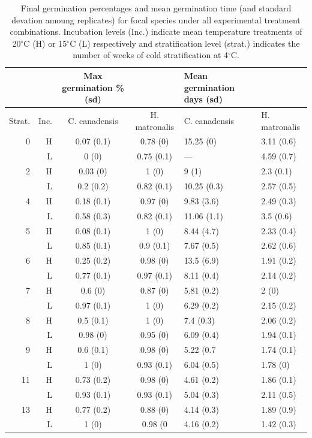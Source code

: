 \documentclass{article}
\begin{document}
\begin{table}[hp]
\centering
\begin{tabular}{|rr|cc|ll|}
   \hline
     & & Max germination \% (sd) & &
   Mean germination days (sd) & \\ 
  \hline
  Strat. & Inc.  & C. canadensis & H. matronalis & C. canadensis & H. matronalis \\ 
  \hline
0 & H & 0.07 (0.1) & 0.78 (0) & 15.25 (0) & 3.11 (0.6) \\ 
  & L & 0 (0) & 0.75 (0.1) & --- & 4.59 (0.7) \\ 
   \hline
 2 & H & 0.03 (0) & 1 (0) & 9 (1) & 2.3 (0.1) \\ 
  & L & 0.2 (0.2) & 0.82 (0.1) & 10.25 (0.3) & 2.57 (0.5) \\ 
   \hline
 4 & H & 0.18 (0.1) & 0.97 (0) & 9.83 (3.6) & 2.49 (0.3) \\ 
 & L & 0.58 (0.3) & 0.82 (0.1) & 11.06 (1.1) & 3.5 (0.6) \\ 
    \hline
    5 & H & 0.08 (0.1) & 1 (0) & 8.44 (4.7) & 2.33 (0.4) \\ 
 & L & 0.85 (0.1) & 0.9 (0.1) & 7.67 (0.5) & 2.62 (0.6) \\ 
   \hline
   6 & H & 0.25 (0.2) & 0.98 (0) & 13.5 (6.9) & 1.91 (0.2) \\ 
  & L & 0.77 (0.1) & 0.97 (0.1) & 8.11 (0.4) & 2.14 (0.2) \\ 
    \hline
    7 & H & 0.6 (0) & 0.87 (0) & 5.81 (0.2) & 2 (0) \\ 
 & L & 0.97 (0.1) & 1 (0) & 6.29 (0.2) & 2.15 (0.2) \\ 
    \hline
    8 & H & 0.5 (0.1) & 1 (0) & 7.4 (0.3) & 2.06 (0.2) \\ 
 & L & 0.98 (0) & 0.95 (0) & 6.09 (0.4) & 1.94 (0.1) \\ 
      \hline
   9 & H & 0.6 (0.1) & 0.98 (0) & 5.22 (0.7 & 1.74 (0.1) \\ 
 & L & 1 (0) & 0.93 (0.1) & 6.04 (0.5) & 1.78 (0) \\ 
      \hline
   11 & H & 0.73 (0.2) & 0.98 (0) & 4.61 (0.2) & 1.86 (0.1) \\ 
 & L & 0.93 (0.1) & 0.93 (0.1) & 5.04 (0.3) & 2.11 (0.5) \\ 
      \hline
   13 & H & 0.77 (0.2) & 0.88 (0) & 4.14 (0.3) & 1.89 (0.9) \\ 
 & L & 1 (0) & 0.98 (0 & 4.16 (0.2) & 1.42 (0.3) \\ 
   \hline
\end{tabular}
\caption{Final germination percentages and mean germination time (and standard devation amoung replicates) for focal species under all experimental treatment combinations. Incubation levels (Inc.) indicate mean temperature treatments of 20$^\circ$C (H) or 15$^\circ$C (L) respectively and stratification level (strat.) indicates the number of weeks of cold stratification at 4$^\circ$C.} %
\label{tab:germcomps}
\end{table}
\end{document}
